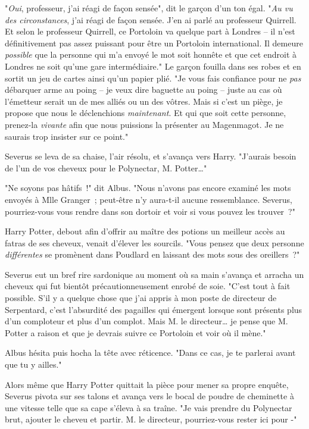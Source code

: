 "\emph{Oui}, professeur, j'ai réagi de façon sensée", dit le garçon d'un ton égal. "\emph{Au vu des circonstances}, j'ai réagi de façon sensée. J'en ai parlé au professeur Quirrell. Et selon le professeur Quirrell, ce Portoloin va quelque part à Londres -- il n'est définitivement pas assez puissant pour être un Portoloin international. Il demeure \emph{possible} que la personne qui m'a envoyé le mot soit honnête et que cet endroit à Londres ne soit qu'une gare intermédiaire." Le garçon fouilla dans ses robes et en sortit un jeu de cartes ainsi qu'un papier plié. "Je vous fais confiance pour ne \emph{pas} débarquer arme au poing -- je veux dire baguette au poing -- juste au cas où l'émetteur serait un de mes alliés ou un des vôtres. Mais si c'est un piège, je propose que nous le déclenchions \emph{maintenant}. Et qui que soit cette personne, prenez-la \emph{vivante} afin que nous puissions la présenter au Magenmagot. Je ne saurais trop insister sur ce point."

Severus se leva de sa chaise, l'air résolu, et s'avança vers Harry. "J'aurais besoin de l'un de vos cheveux pour le Polynectar, M. Potter…"

"Ne soyons pas hâtifs~!" dit Albus. "Nous n'avons pas encore examiné les mots envoyés à Mlle Granger~; peut-être n'y aura-t-il aucune ressemblance. Severus, pourriez-vous vous rendre dans son dortoir et voir si vous pouvez les trouver~?"

Harry Potter, debout afin d'offrir au maître des potions un meilleur accès au fatras de ses cheveux, venait d'élever les sourcils. "Vous pensez que deux personne \emph{différentes} se promènent dans Poudlard en laissant des mots sous des oreillers~?"

Severus eut un bref rire sardonique au moment où sa main s'avança et arracha un cheveux qui fut bientôt précautionneusement enrobé de soie. "C'est tout à fait possible. S'il y a quelque chose que j'ai appris à mon poste de directeur de Serpentard, c'est l'absurdité des pagailles qui émergent lorsque sont présents plus d'un comploteur et plus d'un complot. Mais M. le directeur… je pense que M. Potter a raison et que je devrais suivre ce Portoloin et voir où il mène."

Albus hésita puis hocha la tête avec réticence. "Dans ce cas, je te parlerai avant que tu y ailles."

\later

Alors même que Harry Potter quittait la pièce pour mener sa propre enquête, Severus pivota sur ses talons et avança vers le bocal de poudre de cheminette à une vitesse telle que sa cape s'éleva à sa traîne. "Je vais prendre du Polynectar brut, ajouter le cheveu et partir. M. le directeur, pourriez-vous rester ici pour -"

